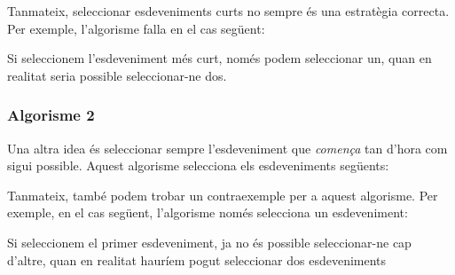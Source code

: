 Tanmateix, seleccionar esdeveniments curts no sempre és
una estratègia correcta. Per exemple, l'algorisme falla
en el cas següent:
\begin{center}
\end{center}
Si seleccionem l'esdeveniment més curt, només podem seleccionar
un, quan en realitat seria possible seleccionar-ne dos.

\subsubsection*{Algorisme 2}

Una altra idea és seleccionar sempre l'esdeveniment
que \emph{comença} tan d'hora com sigui possible.
Aquest algorisme selecciona els esdeveniments següents:
\begin{center}
\end{center}

Tanmateix, també podem trobar un contraexemple
per a aquest algorisme.
Per exemple, en el cas següent,
l'algorisme només selecciona un esdeveniment:
\begin{center}
\end{center}
Si seleccionem el primer esdeveniment, ja no és possible
seleccionar-ne cap d'altre, quan en realitat hauríem pogut
seleccionar dos esdeveniments

